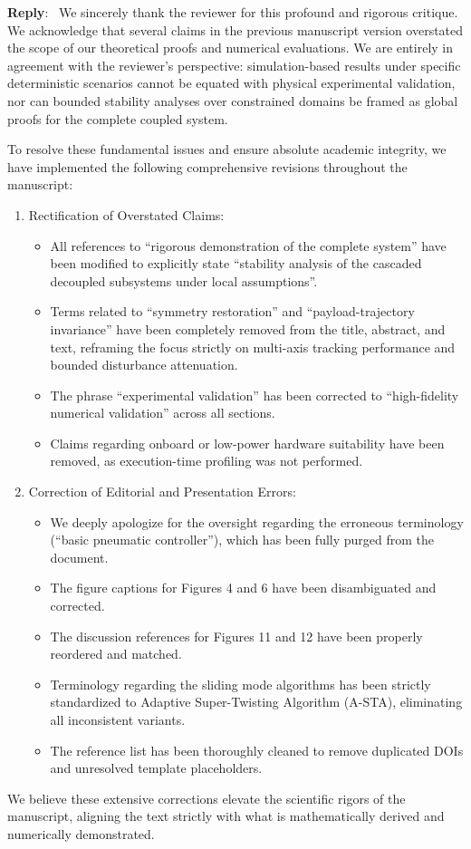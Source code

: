 \documentclass[11pt]{article}
\newcounter{reviewer}
\newenvironment{reply}
   {\medskip \noindent \color{blue} \begin{sf}\textbf{Reply}:\  }
   {\medskip \par \end{sf}}
\begin{document}
\begin{reply}
We sincerely thank the reviewer for this profound and rigorous critique. We acknowledge that several claims in the previous manuscript version overstated the scope of our theoretical proofs and numerical evaluations. We are entirely in agreement with the reviewer’s perspective: simulation-based results under specific deterministic scenarios cannot be equated with physical experimental validation, nor can bounded stability analyses over constrained domains be framed as global proofs for the complete coupled system.

To resolve these fundamental issues and ensure absolute academic integrity, we have implemented the following comprehensive revisions throughout the manuscript:
\begin{enumerate}
\item Rectification of Overstated Claims:
\begin{itemize}
\item All references to “rigorous demonstration of the complete system” have been modified to explicitly state “stability analysis of the cascaded decoupled subsystems under local assumptions”.
\item Terms related to “symmetry restoration” and “payload-trajectory invariance” have been completely removed from the title, abstract, and text, reframing the focus strictly on multi-axis tracking performance and bounded disturbance attenuation.
\item The phrase “experimental validation” has been corrected to “high-fidelity numerical validation” across all sections.
\item Claims regarding onboard or low-power hardware suitability have been removed, as execution-time profiling was not performed.
\end{itemize}
\item Correction of Editorial and Presentation Errors:
\begin{itemize}
\item We deeply apologize for the oversight regarding the erroneous terminology (“basic pneumatic controller”), which has been fully purged from the document.
\item The figure captions for Figures 4 and 6 have been disambiguated and corrected.
\item The discussion references for Figures 11 and 12 have been properly reordered and matched.
\item Terminology regarding the sliding mode algorithms has been strictly standardized to Adaptive Super-Twisting Algorithm (A-STA), eliminating all inconsistent variants.
\item The reference list has been thoroughly cleaned to remove duplicated DOIs and unresolved template placeholders.
\end{itemize}
\end{enumerate}
We believe these extensive corrections elevate the scientific rigors of the manuscript, aligning the text strictly with what is mathematically derived and numerically demonstrated.
\end{reply}
\end{document}
